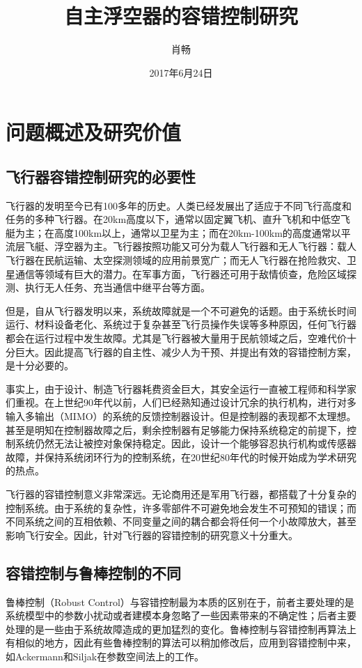 \documentclass{article}
\title{自主浮空器的容错控制研究}
\author{肖畅}
\date{2017年6月24日}
\begin{document}
\maketitle

\section{问题概述及研究价值}
\subsection{飞行器容错控制研究的必要性}
飞行器的发明至今已有100多年的历史。人类已经发展出了适应于不同飞行高度和任务的多种飞行器。在20km高度以下，通常以固定翼飞机、直升飞机和中低空飞艇为主；在高度100km以上，通常以卫星为主；而在20km-100km的高度通常以平流层飞艇、浮空器为主。飞行器按照功能又可分为载人飞行器和无人飞行器：载人飞行器在民航运输、太空探测领域的应用前景宽广；而无人飞行器在抢险救灾、卫星通信等领域有巨大的潜力。在军事方面，飞行器还可用于敌情侦查，危险区域探测、执行无人任务、充当通信中继平台等方面。

但是，自从飞行器发明以来，系统故障就是一个不可避免的话题。由于系统长时间运行、材料设备老化、系统过于复杂甚至飞行员操作失误等多种原因，任何飞行器都会在运行过程中发生故障。尤其是飞行器被大量用于民航领域之后，空难代价十分巨大。因此提高飞行器的自主性、减少人为干预、并提出有效的容错控制方案，是十分必要的。

事实上，由于设计、制造飞行器耗费资金巨大，其安全运行一直被工程师和科学家们重视。在上世纪90年代以前，人们已经熟知通过设计冗余的执行机构，进行对多输入多输出（MIMO）的系统的反馈控制器设计\cite{makarand1988actuator,conner1979fail}。但是控制器的表现都不太理想。甚至是明知在控制器故障之后，剩余控制器有足够能力保持系统稳定的前提下，控制系统仍然无法让被控对象保持稳定\cite{119629}。因此，设计一个能够容忍执行机构或传感器故障，并保持系统闭环行为的控制系统，在20世纪80年代的时候开始成为学术研究的热点。

飞行器的容错控制意义非常深远。无论商用还是军用飞行器，都搭载了十分复杂的控制系统。由于系统的复杂性，许多零部件不可避免地会发生不可预知的错误；而不同系统之间的互相依赖、不同变量之间的耦合都会将任何一个小故障放大，甚至影响飞行安全。因此，针对飞行器的容错控制的研究意义十分重大。

\subsection{容错控制与鲁棒控制的不同}
鲁棒控制（Robust Control）与容错控制最为本质的区别在于，前者主要处理的是系统模型中的参数小扰动或者建模本身忽略了一些因素带来的不确定性；后者主要处理的是一些由于系统故障造成的更加猛烈的变化。鲁棒控制与容错控制再算法上有相似的地方，因此有些鲁棒控制的算法可以稍加修改后，应用到容错控制中来，如Ackermann\cite{ackermann2012sampled,ackermann2012robust}和Siljak\cite{4789828}在参数空间法上的工作。
\end{document}
